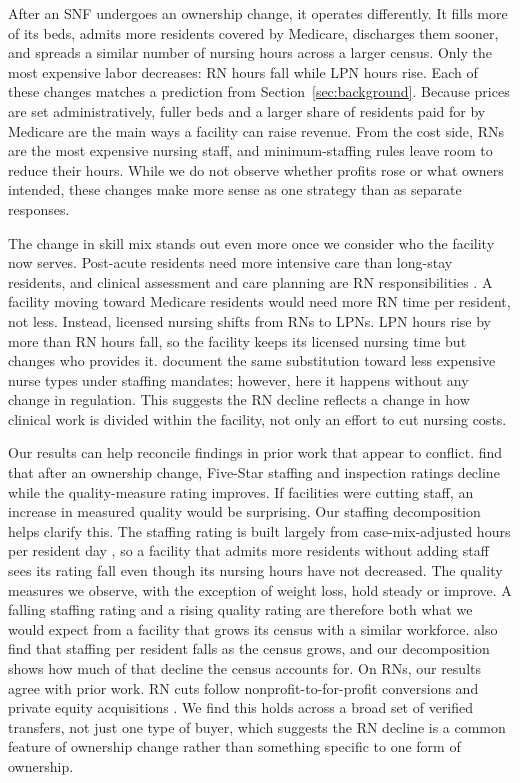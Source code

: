 \documentclass[12pt]{article}
\begin{document}
After an SNF undergoes an ownership change, it operates differently. It fills more of its beds, admits more residents covered by Medicare, discharges them sooner, and spreads a similar number of nursing hours across a larger census. Only the most expensive labor decreases: RN hours fall while LPN hours rise. Each of these changes matches a prediction from Section~\ref{sec:background}. Because prices are set administratively, fuller beds and a larger share of residents paid for by Medicare are the main ways a facility can raise revenue. From the cost side, RNs are the most expensive nursing staff, and minimum-staffing rules leave room to reduce their hours. While we do not observe whether profits rose or what owners intended, these changes make more sense as one strategy than as separate responses.

The change in skill mix stands out even more once we consider who the facility now serves. Post-acute residents need more intensive care than long-stay residents, and clinical assessment and care planning are RN responsibilities \citep{ncsbn2021model}. A facility moving toward Medicare residents would need more RN time per resident, not less. Instead, licensed nursing shifts from RNs to LPNs. LPN hours rise by more than RN hours fall, so the facility keeps its licensed nursing time but changes who provides it. \citet{bowblis_ghattas_2017} document the same substitution toward less expensive nurse types under staffing mandates; however, here it happens without any change in regulation. This suggests the RN decline reflects a change in how clinical work is divided within the facility, not only an effort to cut nursing costs.

Our results can help reconcile findings in prior work that appear to conflict. \citet{RyskinaEtAl2024} find that after an ownership change, Five-Star staffing and inspection ratings decline while the quality-measure rating improves. If facilities were cutting staff, an increase in measured quality would be surprising. Our staffing decomposition helps clarify this. The staffing rating is built largely from case-mix-adjusted hours per resident day \citep{cms_fivestar_2026}, so a facility that admits more residents without adding staff sees its rating fall even though its nursing hours have not decreased. The quality measures we observe, with the exception of weight loss, hold steady or improve. A falling staffing rating and a rising quality rating are therefore both what we would expect from a facility that grows its census with a similar workforce. \citet{prusynski_et_al_2025} also find that staffing per resident falls as the census grows, and our decomposition shows how much of that decline the census accounts for. On RNs, our results agree with prior work. RN cuts follow nonprofit-to-for-profit conversions \citep{lu_lu_2022} and private equity acquisitions \citep{GuptaEtAl2024}. We find this holds across a broad set of verified transfers, not just one type of buyer, which suggests the RN decline is a common feature of ownership change rather than something specific to one form of ownership.
\end{document}
